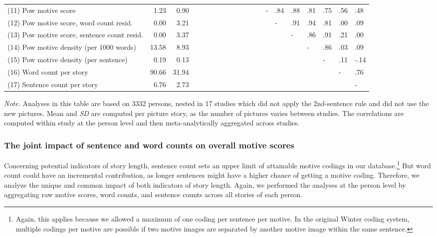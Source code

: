 \documentclass[jou,a4paper]{apa6}\usepackage[]{graphicx}\usepackage[]{color}
\begin{document}
\begin{table}
\begin{threeparttable}
\begin{tabularx}{\textwidth}{Xrrlllllllllllllllll}
  (11) Pow motive score & 1.23 & 0.90 &  &  &  &  &  &  &  &  &  &  & - & .84 & .88 & .81 & .75 & .56 & .48 \\ 
  (12) Pow motive score, word count resid. & 0.00 & 3.21 &  &  &  &  &  &  &  &  &  &  &  & - & .91 & .94 & .81 & .00 & .09 \\ 
  (13) Pow motive score, sentence count resid. & 0.00 & 3.37 &  &  &  &  &  &  &  &  &  &  &  &  & - & .86 & .91 & .21 & .00 \\ 
  (14) Pow motive density (per 1000 words) & 13.58 & 8.93 &  &  &  &  &  &  &  &  &  &  &  &  &  & - & .86 & .03 & .09 \\ 
  (15) Pow motive density (per sentence) & 0.19 & 0.13 &  &  &  &  &  &  &  &  &  &  &  &  &  &  & - & .11 & -.14 \\ 
  (16) Word count per story & 90.66 & 31.94 &  &  &  &  &  &  &  &  &  &  &  &  &  &  &  & - & .76 \\ 
  (17) Sentence count per story & 6.76 & 2.73 &  &  &  &  &  &  &  &  &  &  &  &  &  &  &  &  & - \\ 
   \hline

		\bottomrule
		\end{tabularx}
		\begin{tablenotes}[para,flushleft]
			{\small
			\vspace*{0.75em}
			\textit{Note.} Analyses in this table are based on 3332 persons, nested in 17 studies which did not apply the 2nd-sentence rule and did not use the new pictures. Mean and \emph{SD} are computed per picture story, as the number of pictures varies between studies. The correlations are computed within study at the person level and then meta-analytically aggregated across studies.}
	      \end{tablenotes}
	  \end{threeparttable}
\end{table}


\subsubsection{The joint impact of sentence and word counts on overall motive scores}
Concerning potential indicators of story length, sentence count sets an upper limit of attainable motive codings in our database.\footnote{Again, this applies because we allowed a maximum of one coding per sentence per motive. In the original Winter coding system, multiple codings per motive are possible if two motive images are separated by another motive image within the same sentence.} But word count could have an incremental contribution, as longer sentences might have a higher chance of getting a motive coding. Therefore, we analyze the unique and common impact of both indicators of story length. Again, we performed the analyses at the person level by aggregating raw motive scores, word counts, and sentence counts across all stories of each person.
\end{document}
